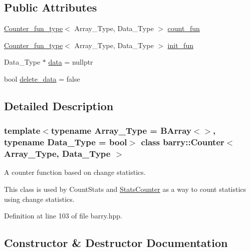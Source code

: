 \subsection*{Public Attributes}
\begin{DoxyCompactItemize}
\item 
\hyperlink{namespacebarry_abaaae3200da8e4b7faac3c04fe9c3081}{Counter\+\_\+fun\+\_\+type}$<$ Array\+\_\+\+Type, Data\+\_\+\+Type $>$ \hyperlink{classbarry_1_1_counter_aa535e164838a3a9c780e8d15fe45679b}{count\+\_\+fun}
\item 
\hyperlink{namespacebarry_abaaae3200da8e4b7faac3c04fe9c3081}{Counter\+\_\+fun\+\_\+type}$<$ Array\+\_\+\+Type, Data\+\_\+\+Type $>$ \hyperlink{classbarry_1_1_counter_a2509d75d3fc9e33d708911a38373d8ab}{init\+\_\+fun}
\item 
Data\+\_\+\+Type $\ast$ \hyperlink{classbarry_1_1_counter_af8196eeaaa4b58b788969c07aee7f1ee}{data} = nullptr
\item 
bool \hyperlink{classbarry_1_1_counter_a5445fa47abeff4b5675a5e5c12e4917a}{delete\+\_\+data} = false
\end{DoxyCompactItemize}


\subsection{Detailed Description}
\subsubsection*{template$<$typename Array\+\_\+\+Type = B\+Array$<$$>$, typename Data\+\_\+\+Type = bool$>$\newline
class barry\+::\+Counter$<$ Array\+\_\+\+Type, Data\+\_\+\+Type $>$}

A counter function based on change statistics. 

This class is used by {\ttfamily Count\+Stats} and {\ttfamily \hyperlink{classbarry_1_1_stats_counter}{Stats\+Counter}} as a way to count statistics using change statistics. 

Definition at line 103 of file barry.\+hpp.



\subsection{Constructor \& Destructor Documentation}
\mbox{\label{classbarry_1_1_counter_a3c990d6dbcdc553b3179c8353497a7df}} 
